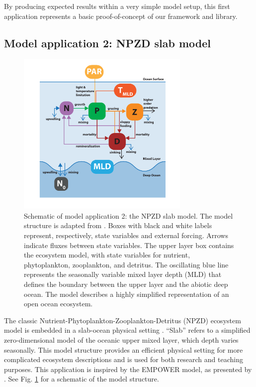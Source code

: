 \documentclass[journal abbreviation, manuscript]{copernicus}
\begin{document}
By producing expected results within a very simple model setup, this first application represents a basic proof-of-concept of our framework and library.




\subsection{Model application 2: NPZD slab model}
\begin{figure}[t]
\includegraphics[width=8.3cm]{Figures/firstdraft_schematics/02_schematics_EMPOWER.pdf}
\caption{Schematic of model application 2: the NPZD slab model. The model structure is adapted from \citet{Anderson2015c}. Boxes with black and white labels represent, respectively, state variables and external forcing. Arrows indicate fluxes between state variables. The upper layer box contains the ecosystem model, with state variables for nutrient, phytoplankton, zooplankton, and detritus. The oscillating blue line represents the seasonally variable mixed layer depth (MLD) that defines the boundary between the upper layer and the abiotic deep ocean. The model describes a highly simplified representation of an open ocean ecosystem.}
\label{Figure:ModelSchematics_2}
\end{figure}

The classic Nutrient-Phytoplankton-Zooplankton-Detritus (NPZD) ecosystem model  is embedded in a slab-ocean physical setting \citep[e.g.,][]{Evans1985ACycles, Fasham1990a}. “Slab” refers to a simplified zero-dimensional model of the oceanic upper mixed layer, which depth varies seasonally. This model structure provides an efficient physical setting for more complicated ecosystem descriptions and is used for both research and teaching purposes. This application is inspired by the EMPOWER model, as presented by \citet{Anderson2015c}. See Fig. \ref{Figure:ModelSchematics_2} for a schematic of the model structure.
\end{document}
